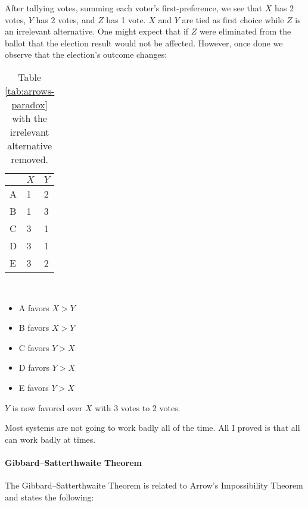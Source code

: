 After tallying votes, summing each voter's first-preference, we see that $X$ has
2 votes, $Y$ has 2 votes, and $Z$ has 1 vote. $X$ and $Y$ are tied as first
choice while $Z$ is an irrelevant alternative. One might expect that if $Z$ were
eliminated from the ballot that the election result would not be affected.
However, once done we observe that the election's outcome changes:

\begin{center}
    \begin{table}[H]
        \centering\scriptsize
        \caption{Table \ref{tab:arrows-paradox} with the irrelevant alternative removed.}
        \label{tab:arrows-paradox-remove-alt}
        \begin{tabu} to 30mm{@{} X[c] | X[c] X[c] @{}}
            \toprule
            & $X$ & $Y$ \\
            \midrule
            A & 1 & 2 \\
            B & 1 & 3 \\
            C & 3 & 1 \\
            D & 3 & 1 \\
            E & 3 & 2 \\
            \bottomrule
        \end{tabu} \\[2mm]
        \begin{varwidth}{\textwidth}
            \begin{itemize}[label=,leftmargin=0mm,topsep=5mm]
                \item A favors $X > Y$
                \item B favors $X > Y$
                \item C favors $Y > X$
                \item D favors $Y > X$
                \item E favors $Y > X$
            \end{itemize}
        \end{varwidth}
    \end{table}
\end{center}

$Y$ is now favored over $X$ with 3 votes to 2 votes.

\begin{displayquote}
  Most systems are not going to work badly all of the time. All I proved is that
  all can work badly at times.
\end{displayquote}

\paragraph{Gibbard–Satterthwaite Theorem}
The Gibbard–Satterthwaite Theorem is related to Arrow's Impossibility Theorem
and states the following:

